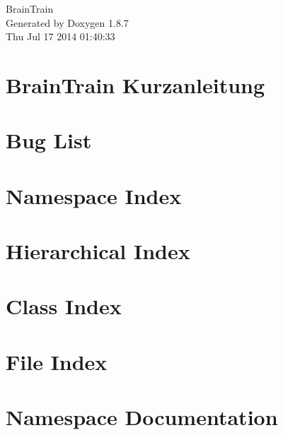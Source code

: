 \documentclass[twoside]{book}
\newcommand{\+}{\discretionary{\mbox{\scriptsize$\hookleftarrow$}}{}{}}
\newcommand{\clearemptydoublepage}{%
  \newpage{\pagestyle{empty}\cleardoublepage}%
}
\begin{document}
\hypersetup{pageanchor=false,
             bookmarks=true,
             bookmarksnumbered=true,
             pdfencoding=unicode
            }
\begin{titlepage}
\vspace*{7cm}
\begin{center}%
{\Large Brain\+Train }\\
\vspace*{1cm}
{\large Generated by Doxygen 1.8.7}\\
\vspace*{0.5cm}
{\small Thu Jul 17 2014 01:40:33}\\
\end{center}
\end{titlepage}
\clearemptydoublepage
\tableofcontents
\clearemptydoublepage
{}
\hypersetup{pageanchor=true}

\chapter{Brain\+Train Kurzanleitung}
\label{index}\hypertarget{index}{}
\chapter{Bug List}
\label{bug}
\hypertarget{bug}{}

\chapter{Namespace Index}

\chapter{Hierarchical Index}

\chapter{Class Index}

\chapter{File Index}

\chapter{Namespace Documentation}

\end{document}
